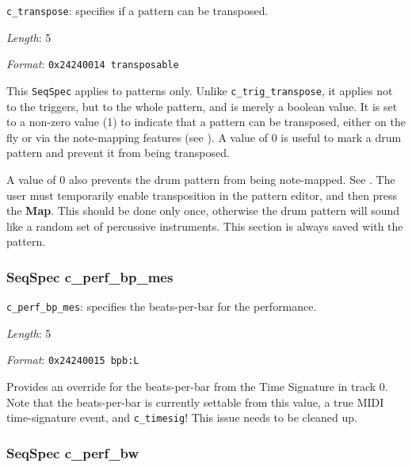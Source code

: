    \begin{description}
      \item \texttt{c\_transpose}: specifies if a pattern can be transposed.
      \item \textsl{Length}: 5
      \item \textsl{Format}: \texttt{0x24240014 transposable}
   \end{description}

   This
   \texttt{SeqSpec} applies to patterns only.
   Unlike \texttt{c\_trig\_transpose}, it applies not to the triggers, but
   to the whole pattern, and is merely a boolean value.
   It is set to a non-zero value (1) to indicate
   that a pattern can be transposed, either on the fly or via the
   note-mapping features (see ).
   A value of 0 is useful to mark a drum pattern and prevent it from being
   transposed.

   A value of 0 also prevents the drum pattern from being note-mapped.
   See .
   The user must temporarily enable transposition in the pattern editor, and
   then press the \textbf{Map}.  This should be done only once, otherwise the
   drum pattern will sound like a random set of percussive instruments.
   This section is always saved with the pattern.

\subsubsection{SeqSpec c\_perf\_bp\_mes}
\label{subsubsec:midi_format_track_seqspec_perf_bp_mes}

   \begin{description}
      \item \texttt{c\_perf\_bp\_mes}:
         specifies the beats-per-bar for the performance.
      \item \textsl{Length}: 5
      \item \textsl{Format}: \texttt{0x24240015 bpb:L}
   \end{description}

   Provides an override for the beats-per-bar from the Time Signature in track
   0.  Note that the beats-per-bar is currently settable from this value,
   a true MIDI time-signature event, and \texttt{c\_timesig}!
   This issue needs to be cleaned up.

\subsubsection{SeqSpec c\_perf\_bw}
\label{subsubsec:midi_format_track_seqspec_perf_bw}

